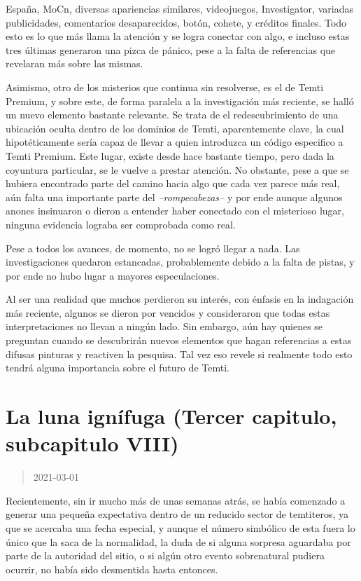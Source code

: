\documentclass[
  spanish,
]{book}
\begin{document}
España, MoCn, diversas apariencias similares, videojuegos, Investigator, variadas publicidades, comentarios desaparecidos, botón, cohete, y créditos finales. Todo esto es lo que más llama la atención y se logra conectar con algo, e incluso estas tres últimas generaron una pizca de pánico, pese a la falta de referencias que revelaran más sobre las mismas.

Asimismo, otro de los misterios que continua sin resolverse, es el de Temti Premium, y sobre este, de forma paralela a la investigación más reciente, se halló un nuevo elemento bastante relevante. Se trata de el redescubrimiento de una ubicación oculta dentro de los dominios de Temti, aparentemente clave, la cual hipotéticamente sería capaz de llevar a quien introduzca un código especifico a Temti Premium. Este lugar, existe desde hace bastante tiempo, pero dada la coyuntura particular, se le vuelve a prestar atención.
No obstante, pese a que se hubiera encontrado parte del camino hacia algo que cada vez parece más real, aún falta una importante parte del \emph{--rompecabezas--} y por ende aunque algunos anones insinuaron o dieron a entender haber conectado con el misterioso lugar, ninguna evidencia lograba ser comprobada como real.

Pese a todos los avances, de momento, no se logró llegar a nada. Las investigaciones quedaron estancadas, probablemente debido a la falta de pistas, y por ende no hubo lugar a mayores especulaciones.

Al ser una realidad que muchos perdieron su interés, con énfasis en la indagación más reciente, algunos se dieron por vencidos y consideraron que todas estas interpretaciones no llevan a ningún lado. Sin embargo, aún hay quienes se preguntan cuando se descubrirán nuevos elementos que hagan referencias a estas difusas pinturas y reactiven la pesquisa. Tal vez eso revele si realmente todo esto tendrá alguna importancia sobre el futuro de Temti.

\hypertarget{la-luna-ignuxedfuga-tercer-capitulo-subcapitulo-viii}{%
\section{La luna ignífuga (Tercer capitulo, subcapitulo VIII)}\label{la-luna-ignuxedfuga-tercer-capitulo-subcapitulo-viii}}

\begin{quote}
2021-03-01
\end{quote}

Recientemente, sin ir mucho más de unas semanas atrás, se había comenzado a generar una pequeña expectativa dentro de un reducido sector de temtiteros, ya que se acercaba una fecha especial, y aunque el número simbólico de esta fuera lo único que la saca de la normalidad, la duda de si alguna sorpresa aguardaba por parte de la autoridad del sitio, o si algún otro evento sobrenatural pudiera ocurrir, no había sido desmentida hasta entonces.
\end{document}
